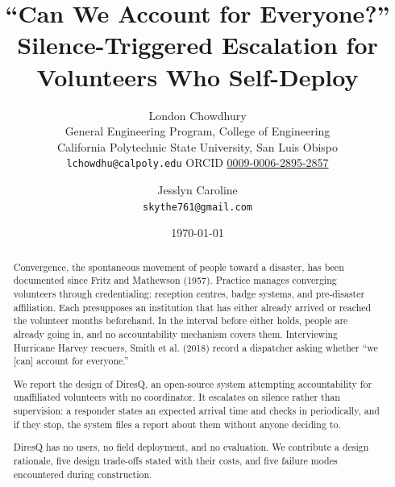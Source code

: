 \documentclass[11pt,a4paper]{article}
\title{``Can We Account for Everyone?''\\[0.3em]
       \large Silence-Triggered Escalation for Volunteers Who Self-Deploy}
\author{London Chowdhury\\[0.35em]
\normalsize General Engineering Program, College of Engineering\\
\normalsize California Polytechnic State University, San Luis Obispo\\
\small\texttt{lchowdhu@calpoly.edu} \quad
ORCID \href{https://orcid.org/0009-0006-2895-2857}{0009-0006-2895-2857}
\and
Jesslyn Caroline\\[0.35em]
\small\texttt{skythe761@gmail.com}}
\date{\today}
\begin{document}
\maketitle

\begin{abstract}
Convergence, the spontaneous movement of people toward a disaster, has
been documented since Fritz and Mathewson (1957). Practice manages
converging volunteers through credentialing: reception centres, badge
systems, and pre-disaster affiliation. Each presupposes an institution
that has either already arrived or reached the volunteer months
beforehand. In the interval before either holds, people are already
going in, and no accountability mechanism covers them. Interviewing
Hurricane Harvey rescuers, Smith et al. (2018) record a dispatcher
asking whether ``we {[}can{]} account for everyone.''

We report the design of DiresQ, an open-source system attempting
accountability for unaffiliated volunteers with no coordinator. It
escalates on silence rather than supervision: a responder states an
expected arrival time and checks in periodically, and if they stop, the
system files a report about them without anyone deciding to.

DiresQ has no users, no field deployment, and no evaluation. We
contribute a design rationale, five design trade-offs stated with their
costs, and five failure modes encountered during construction.
\end{abstract}





\end{document}
